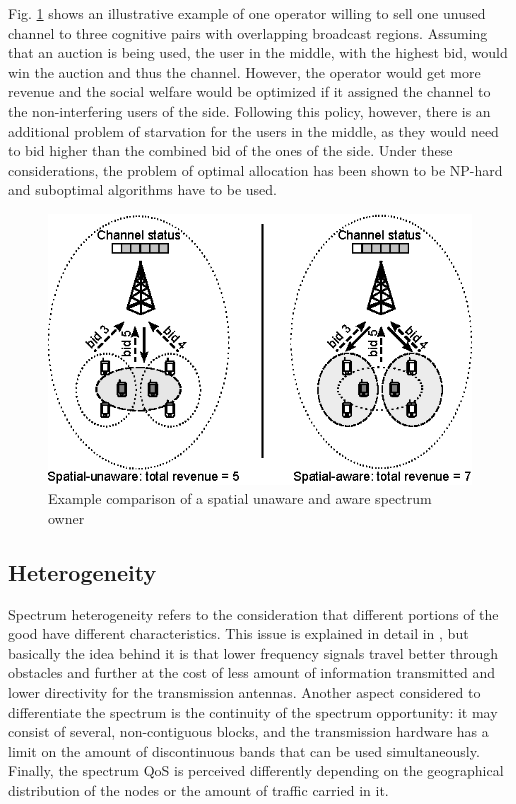 Fig. \ref{fig:SpecReuse} shows an illustrative example of one operator willing to sell one unused channel to three cognitive pairs with overlapping broadcast regions. Assuming that an auction is being used, the user in the middle, with the highest bid, would win the auction and thus the channel. However, the operator would get more revenue and the social welfare would be optimized if it assigned the channel to the non-interfering users of the side. Following this policy, however, there is an additional problem of starvation for the users in the middle, as they would need to bid higher than the combined bid of the ones of the side. Under these considerations, the problem of optimal allocation has been shown to be NP-hard \cite{ref:Gopinathan2011} and suboptimal algorithms have to be used.

\begin{figure}[!ht]
  \begin{center}
  \includegraphics[scale=1.5]{Fig2.eps}
  \end{center}
  \caption{Example comparison of a spatial unaware and aware spectrum owner}
   \label{fig:SpecReuse}
\end{figure}

\subsection{Heterogeneity}
\label{subsec:Differentiation}
Spectrum heterogeneity \cite{ref:Gao2011,ref:Duan2011_Contract,ref:Xing2007,ref:Jia2008_com,ref:Niyato2008_Comp,ref:Min2011,ref:Dixit2010,ref:Niyato2007_Eq} refers to the consideration that different portions of the good have  different characteristics. This issue is explained in detail in \cite{ref:Xing2007}, but basically the idea behind it is that lower frequency signals travel better through obstacles and further at the cost of less amount of information transmitted and lower directivity for the transmission antennas. Another aspect considered to differentiate the spectrum is the continuity of the spectrum opportunity: it may consist of several, non-contiguous blocks, and the transmission hardware has a limit on the amount of discontinuous bands that can be used simultaneously. Finally, the spectrum QoS is perceived differently depending on the geographical distribution of the nodes or the amount of traffic carried in it.

